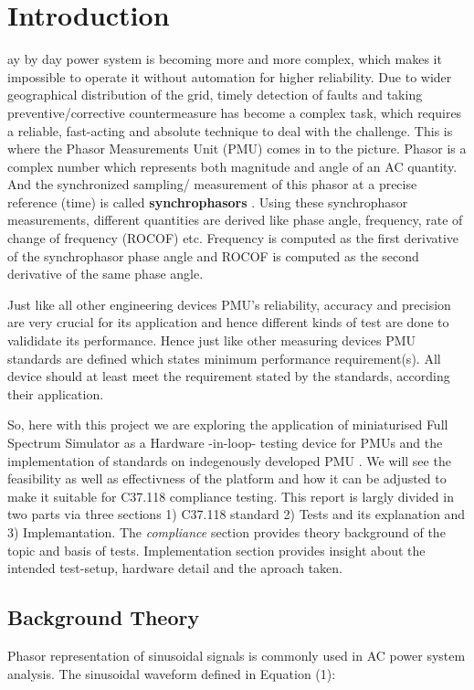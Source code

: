 \section{Introduction}
ay by day power system is becoming more and more complex, which makes it impossible to operate it without automation for higher reliability. Due to wider geographical distribution of the grid, timely detection of faults and taking preventive/corrective countermeasure  has become a complex task, which requires a reliable, fast-acting and absolute technique to deal with the challenge. This is where the Phasor Measurements Unit (PMU) comes in to the picture. Phasor is a complex number which represents both magnitude and angle of an AC quantity. And the synchronized sampling/ measurement of this phasor at a precise reference (time) is called \textbf{synchrophasors} \cite{std:c37}. Using these synchrophasor measurements, different quantities are derived like phase angle, frequency, rate of change of frequency (ROCOF) etc. Frequency is computed as the first derivative of the synchrophasor phase angle and ROCOF is computed as the second derivative of the same phase angle. 

Just like all other engineering devices PMU's reliability, accuracy  and precision are very crucial for its application and hence different kinds of test are done to valididate its performance. Hence just like other measuring devices PMU standards are defined which states minimum performance requirement(s). All device should at least meet the requirement stated by the standards, according their application. 

So, here with this project we are exploring the application of miniaturised Full Spectrum Simulator as a Hardware -in-loop- testing device for PMUs and the implementation of standards on indegenously developed PMU . We will see the feasibility as well as effectivness of the platform and how it can be adjusted to make it suitable for C37.118 compliance testing. This report is largly divided in two parts via three sections 1) C37.118 standard 2) Tests and its explanation and 3) Implemantation. The \textit{compliance} section provides theory background of the topic and basis of tests. Implementation section provides insight about the intended test-setup, hardware detail and the aproach taken. 

\subsection{Background Theory}
Phasor representation of sinusoidal signals is commonly used in AC power system analysis. The sinusoidal waveform defined in Equation (1):

